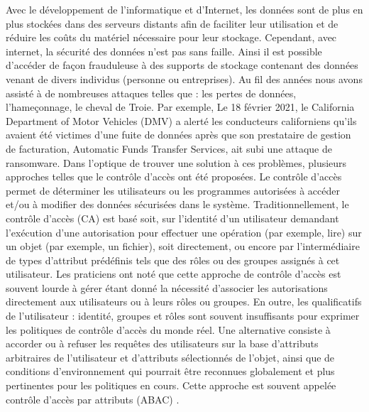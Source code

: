 

  Avec le développement de l'informatique et d'Internet, les données sont de plus en plus stockées dans des serveurs distants afin de faciliter leur utilisation et de réduire les coûts du matériel nécessaire pour leur stockage. Cependant, avec internet, la sécurité des données n'est pas sans faille. Ainsi il est possible d'accéder de façon frauduleuse à des supports de stockage contenant des données venant de divers individus (personne ou entreprises). Au fil des années nous avons assisté à de nombreuses attaques telles que : les pertes de données, l'hameçonnage, le cheval de Troie. Par exemple, Le 18 février 2021, le California Department of Motor Vehicles (DMV) a alerté les conducteurs californiens qu'ils avaient été victimes d'une fuite de données après que son prestataire de gestion de facturation, Automatic Funds Transfer Services, ait subi une attaque de ransomware. Dans l'optique de trouver une solution à ces problèmes, plusieurs approches telles que le contrôle d'accès ont été proposées. Le contrôle d'accès  permet de déterminer les utilisateurs ou les programmes autorisées à accéder et/ou à modifier des données sécurisées dans le système. Traditionnellement, le contrôle d'accès (CA) est basé soit, sur l'identité d'un utilisateur demandant l'exécution d'une autorisation pour effectuer une opération (par exemple, lire) sur un objet (par exemple, un fichier), soit directement, ou encore par l'intermédiaire de types d'attribut prédéfinis tels que des rôles ou des groupes assignés à cet utilisateur. Les praticiens ont noté que cette approche de contrôle d'accès est souvent lourde à gérer étant donné la nécessité d'associer les autorisations directement aux utilisateurs ou à leurs rôles ou groupes. En outre, les qualificatifs de l'utilisateur : identité, groupes et rôles sont souvent insuffisants pour exprimer les politiques de contrôle d'accès du monde réel. Une alternative consiste à accorder ou à refuser les requêtes des utilisateurs sur la base d'attributs arbitraires de l'utilisateur et d'attributs sélectionnés de l'objet, ainsi que de conditions d'environnement qui pourrait être reconnues globalement et plus pertinentes pour les politiques en cours. Cette approche est souvent appelée contrôle d'accès par attributs (ABAC) \cite{Vin15}.
